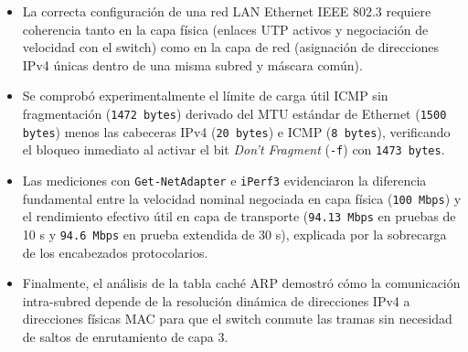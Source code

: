 \documentclass[11pt, a4paper]{article}
\begin{document}
\begin{itemize}
    \item La correcta configuración de una red LAN Ethernet IEEE 802.3 requiere coherencia tanto en la capa física (enlaces UTP activos y negociación de velocidad con el switch) como en la capa de red (asignación de direcciones IPv4 únicas dentro de una misma subred y máscara común).
    \item Se comprobó experimentalmente el límite de carga útil ICMP sin fragmentación (\texttt{1472 bytes}) derivado del MTU estándar de Ethernet (\texttt{1500 bytes}) menos las cabeceras IPv4 (\texttt{20 bytes}) e ICMP (\texttt{8 bytes}), verificando el bloqueo inmediato al activar el bit \textit{Don't Fragment} (\texttt{-f}) con \texttt{1473 bytes}.
    \item Las mediciones con \texttt{Get-NetAdapter} e \texttt{iPerf3} evidenciaron la diferencia fundamental entre la velocidad nominal negociada en capa física (\texttt{100 Mbps}) y el rendimiento efectivo útil en capa de transporte (\texttt{94.13 Mbps} en pruebas de 10 s y \texttt{94.6 Mbps} en prueba extendida de 30 s), explicada por la sobrecarga de los encabezados protocolarios.
    \item Finalmente, el análisis de la tabla caché ARP demostró cómo la comunicación intra-subred depende de la resolución dinámica de direcciones IPv4 a direcciones físicas MAC para que el switch conmute las tramas sin necesidad de saltos de enrutamiento de capa 3.
\end{itemize}
\end{document}
